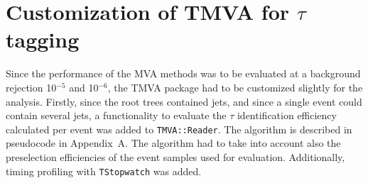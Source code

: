\documentclass[a4paper]{jpconf}
\begin{document}






 

\section{Customization of TMVA for $\tau$ tagging}\label{sec:customization}
Since the performance of the MVA methods was to be evaluated at a
background rejection 10$^{-5}$ and 10$^{-6}$, the TMVA package had to
be customized slightly for the analysis.
Firstly, since the root trees contained jets, and since a single event
could contain several jets, a functionality to evaluate the $\tau$
identification efficiency calculated per event was added to 
{\tt TMVA::Reader}.  
The algorithm is described in pseudocode in
Appendix~A. %
The algorithm had to take into account also the preselection
efficiencies of the event samples used for evaluation. Additionally,
timing profiling with {\tt TStopwatch} was added.
\end{document}
